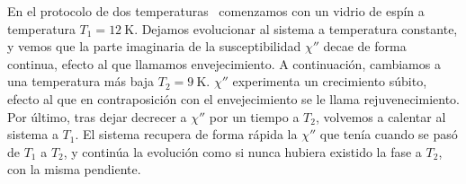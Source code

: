 \documentclass[11pt]{report}
\begin{document}
En el protocolo de dos temperaturas~\cite{threeprotocolpaper}
comenzamos con un vidrio de espín a temperatura $T_1=\SI{12}{\K}$.
Dejamos evolucionar al sistema a temperatura constante, y vemos que la
parte imaginaria de la susceptibilidad $χ''$ decae de forma continua,
efecto al que llamamos envejecimiento. A continuación, cambiamos a una
temperatura más baja $T_2=\SI{9}{\K}$. $χ''$ experimenta un
crecimiento súbito, efecto al que en contraposición con el
envejecimiento se le llama rejuvenecimiento. Por último, tras dejar
decrecer a $χ''$ por un tiempo a $T_2$, volvemos a calentar al sistema
a $T_1$. El sistema recupera de forma rápida la $χ''$ que tenía cuando
se pasó de $T_1$ a $T_2$, y continúa la evolución como si nunca
hubiera existido la fase a $T_2$, con la misma pendiente.


\begin{figure}
  \centering


\end{figure}
\end{document}

